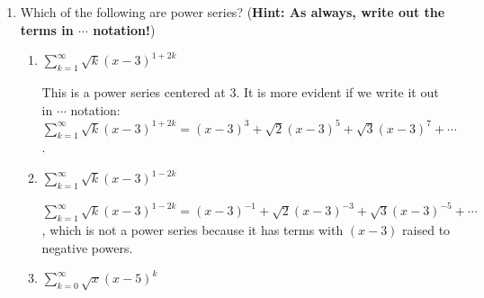 \documentclass[main]{subfiles}
\begin{document}
  \begin{enumerate}[resume]
  \item 
  
  Which of the following are power series? (\textbf{Hint: As always, write out the terms in $\cdots$ notation!})
  \probonly{}
  \begin{enumerate}
    \item


    \begin{problem}[0.2in]
    $\displaystyle \sum_{k=1}^\infty \sqrt{k} (x - 3)^{1 + 2k}$
    \end{problem}

    \begin{solution}
    This is a power series centered at 3.  It is more evident if we
    write it out in $\cdots$ notation: $\displaystyle
    \sum_{k=1}^\infty \sqrt{k} (x - 3)^{1 + 2k} = (x - 3)^3 +
    \sqrt{2} (x - 3)^5 + \sqrt{3} (x - 3)^7 + \cdots$.
    \end{solution}

    \item
    \begin{problem}[0.2in]
    $\displaystyle \sum_{k=1}^\infty \sqrt{k} (x - 3)^{1 - 2k}$
    \end{problem}

    \begin{solution}
    $\displaystyle \sum_{k=1}^\infty \sqrt{k} (x - 3)^{1 - 2k} = (x -
    3)^{-1} + \sqrt{2} (x - 3)^{-3} + \sqrt{3} (x - 3)^{-5} + \cdots$,
    which is not a power series because it has terms with $(x - 3)$
    raised to negative powers.
    \end{solution}


    \item
    \begin{problem}[0.2in]
    $\displaystyle \sum_{k=0}^\infty \sqrt{x} (x - 5)^{k}$
    \end{problem}


\end{enumerate}
\end{enumerate}
\end{document}
